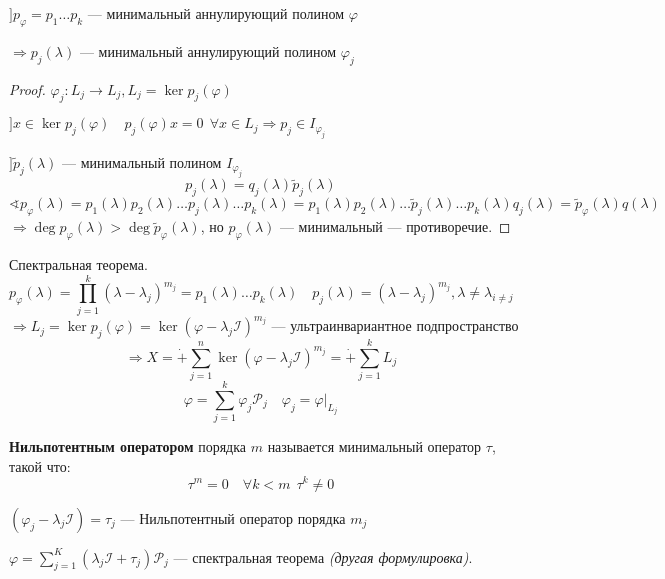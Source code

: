 \begin{lemma}
    $] p_\varphi=p_1\ldots p_k$ --- минимальный аннулирующий полином $\varphi$

    $\Rightarrow p_j(\lambda)$ --- минимальный аннулирующий полином $\varphi_j$
\end{lemma}
\begin{proof}
    $\varphi_j : L_j \rightarrow L_j , L_j=\ker p_j(\varphi)$

    $] x\in\ker p_j(\varphi) \quad p_j(\varphi) x = 0 \ \ \forall x\in L_j \Rightarrow p_j\in I_{\varphi_j}$

    $] \tilde p_j(\lambda)$ --- минимальный полином $I_{\varphi_j}$
    $$p_j(\lambda)=q_j(\lambda)\tilde p_j(\lambda)$$
    $$\sphericalangle p_\varphi(\lambda)=p_1(\lambda)p_2(\lambda)\ldots p_j(\lambda)\ldots p_k(\lambda)=p_1(\lambda)p_2(\lambda)\ldots \tilde p_j(\lambda)\ldots p_k(\lambda)q_j(\lambda)=\tilde p_\varphi(\lambda)q(\lambda)$$
    $\Rightarrow \deg p_\varphi(\lambda) > \deg \tilde p_\varphi(\lambda)$, но $p_\varphi(\lambda)$ --- минимальный --- противоречие.
\end{proof}

\begin{theorem}
    Спектральная теорема.
    $$p_\varphi(\lambda)=\prod_{j=1}^k (\lambda-\lambda_j)^{m_j}=p_1(\lambda)\ldots p_k(\lambda) \quad p_j(\lambda)=(\lambda-\lambda_j)^{m_j}, \lambda\not=\lambda_{i\not=j}$$
    $$\Rightarrow L_j=\ker p_j(\varphi)=\ker(\varphi-\lambda_j\mathcal I)^{m_j} \text{ --- ультраинвариантное подпространство}$$
    $$\Rightarrow X = \dot+ \sum_{j=1}^n \ker (\varphi-\lambda_j\mathcal I)^{m_j}=\dot+\sum_{j=1}^k L_j$$
    $$\varphi = \sum_{j=1}^k \varphi_j \mathcal P_j \quad \varphi_j = \varphi|_{L_j}$$
\end{theorem}


\begin{definition}
    \textbf{Нильпотентным оператором} порядка $m$ называется минимальный оператор $\tau$, такой что:
    $$\tau^m=0 \quad \forall k<m \ \ \tau^k\not=0$$
\end{definition}
\begin{remark}
    $(\varphi_j - \lambda_j \mathcal I)=\tau_j$ --- Нильпотентный оператор порядка $m_j$
\end{remark}

$\varphi=\sum\limits_{j=1}^K (\lambda_j \mathcal I + \tau_j)\mathcal P_j$ --- спектральная теорема \textit{(другая формулировка)}.

